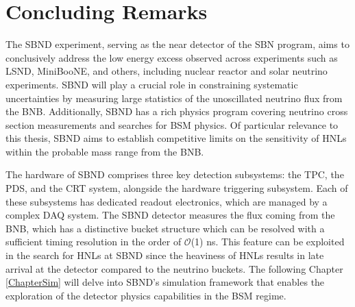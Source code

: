 \section{Concluding Remarks}
\label{sec:sbnd_conclude}

The SBND experiment, serving as the near detector of the SBN program, aims to conclusively address the low energy excess observed across experiments such as LSND, MiniBooNE, and others, including nuclear reactor and solar neutrino experiments. 
SBND will play a crucial role in constraining systematic uncertainties by measuring large statistics of the unoscillated neutrino flux from the BNB.
Additionally, SBND has a rich physics program covering neutrino cross section measurements and searches for BSM physics. 
Of particular relevance to this thesis, SBND aims to establish competitive limits on the sensitivity of HNLs within the probable mass range from the BNB.

The hardware of SBND comprises three key detection subsystems: the TPC, the PDS, and the CRT system, alongside the hardware triggering subsystem. 
Each of these subsystems has dedicated readout electronics, which are managed by a complex DAQ system.
The SBND detector measures the flux coming from the BNB, which has a distinctive bucket structure which can be resolved with a sufficient timing resolution in the order of $\mathcal{O}$(1) ns. 
This feature can be exploited in the search for HNLs at SBND since the heaviness of HNLs results in late arrival at the detector compared to the neutrino buckets. 
The following Chapter \ref{ChapterSim} will delve into SBND's simulation framework that enables the exploration of the detector physics capabilities in the BSM regime.  

